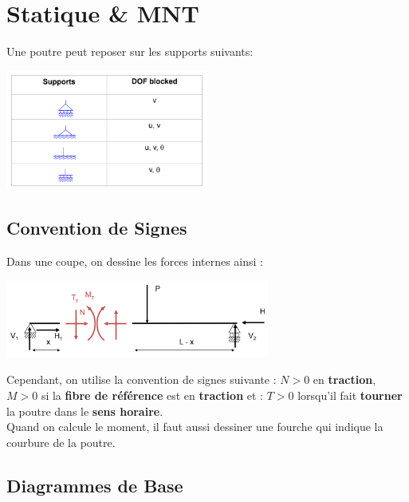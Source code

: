 \documentclass[a4paper]{article}
\begin{document}
\section{Statique \& MNT}





Une poutre peut reposer sur les supports suivants:

\begin{center} \includegraphics[width=0.5\textwidth]{images/Statique01.PNG} \end{center}





\subsection{Convention de Signes}





Dans une coupe, on dessine les forces internes ainsi : 

\begin{center} \includegraphics[width=0.65\textwidth]{images/MNT01.PNG} \end{center}

Cependant, on utilise la convention de signes suivante : $ N > 0 $ en \textbf{traction}, $ M > 0 $ si la \textbf{fibre de référence} est en \textbf{traction} et : $ T > 0 $ lorsqu'il fait \textbf{tourner} la poutre dans le \textbf{sens horaire}. \\
Quand on calcule le moment, il faut aussi dessiner une fourche qui indique la courbure de la poutre.





\subsection{Diagrammes de Base}
\end{document}
